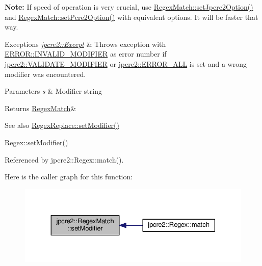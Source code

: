 {\bfseries Note\+:} If speed of operation is very crucial, use \hyperlink{classjpcre2_1_1RegexMatch_a0d76033d9c134caa9ddfc21849603920}{Regex\+Match\+::set\+Jpcre2\+Option()} and \hyperlink{classjpcre2_1_1RegexMatch_ae4ab558c2bec0bc9639dbca70ab47496}{Regex\+Match\+::set\+Pcre2\+Option()} with equivalent options. It will be faster that way. 
\begin{DoxyExceptions}{Exceptions}
{\em \hyperlink{classjpcre2_1_1Except}{jpcre2\+::\+Except}} & Throws exception with \hyperlink{namespacejpcre2_1_1ERROR_a4b2998984439438fa9da8d7043909bc2a4115340549b623f4e2da285bf0aa9bff}{E\+R\+R\+O\+R\+::\+I\+N\+V\+A\+L\+I\+D\+\_\+\+M\+O\+D\+I\+F\+I\+ER} as error number if \hyperlink{namespacejpcre2_a85c143271501e383843f45b9999c2f00a9124b768bcae4d51430aa7f26126f387}{jpcre2\+::\+V\+A\+L\+I\+D\+A\+T\+E\+\_\+\+M\+O\+D\+I\+F\+I\+ER} or \hyperlink{namespacejpcre2_a85c143271501e383843f45b9999c2f00a6fec35fc9fdd8a606bed430c1816c552}{jpcre2\+::\+E\+R\+R\+O\+R\+\_\+\+A\+LL} is set and a wrong modifier was encountered. \\
\hline
\end{DoxyExceptions}

\begin{DoxyParams}{Parameters}
{\em s} & Modifier string \\
\hline
\end{DoxyParams}
\begin{DoxyReturn}{Returns}
\hyperlink{classjpcre2_1_1RegexMatch}{Regex\+Match}\& 
\end{DoxyReturn}
\begin{DoxySeeAlso}{See also}
\hyperlink{classjpcre2_1_1RegexReplace_ae2abe2994b0fbe54950f88e63000c910}{Regex\+Replace\+::set\+Modifier()} 

\hyperlink{classjpcre2_1_1Regex_aed9865b58c60945e19f36fa310f5a595}{Regex\+::set\+Modifier()} 
\end{DoxySeeAlso}


Referenced by jpcre2\+::\+Regex\+::match().



Here is the caller graph for this function\+:\nopagebreak
\begin{figure}[H]
\begin{center}
\leavevmode
\includegraphics[width=330pt]{classjpcre2_1_1RegexMatch_a9df7e92f96b61553f62720cb8f5f23e5_icgraph}
\end{center}
\end{figure}


